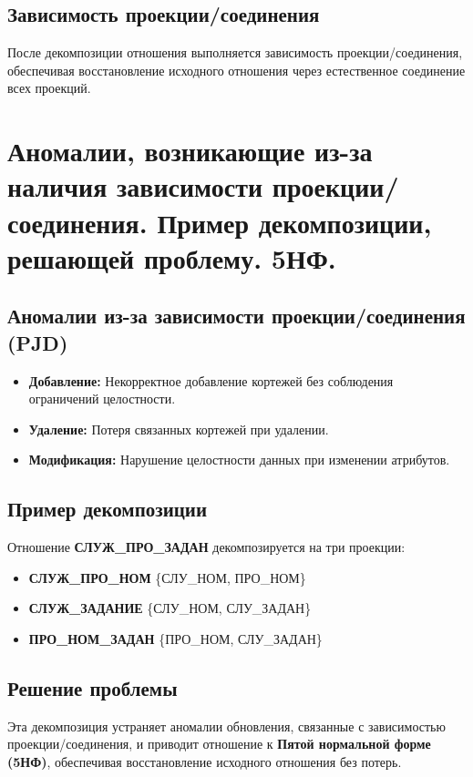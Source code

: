 \documentclass[a4paper,12pt]{article}
\begin{document}
\subsection{Зависимость проекции/соединения}

После декомпозиции отношения выполняется зависимость проекции/соединения, обеспечивая восстановление исходного отношения через естественное соединение всех проекций.

\section{Аномалии, возникающие из-за наличия зависимости проекции/соединения. Пример декомпозиции, решающей проблему. 5НФ.}

\subsection{Аномалии из-за зависимости проекции/соединения (PJD)}

\begin{itemize}
    \item \textbf{Добавление:} Некорректное добавление кортежей без соблюдения ограничений целостности.
    \item \textbf{Удаление:} Потеря связанных кортежей при удалении.
    \item \textbf{Модификация:} Нарушение целостности данных при изменении атрибутов.
\end{itemize}

\subsection{Пример декомпозиции}

Отношение \textbf{СЛУЖ\_ПРО\_ЗАДАН} декомпозируется на три проекции:
\begin{itemize}
    \item \textbf{СЛУЖ\_ПРО\_НОМ} \{СЛУ\_НОМ, ПРО\_НОМ\}
    \item \textbf{СЛУЖ\_ЗАДАНИЕ} \{СЛУ\_НОМ, СЛУ\_ЗАДАН\}
    \item \textbf{ПРО\_НОМ\_ЗАДАН} \{ПРО\_НОМ, СЛУ\_ЗАДАН\}
\end{itemize}

\subsection{Решение проблемы}

Эта декомпозиция устраняет аномалии обновления, связанные с зависимостью проекции/соединения, и приводит отношение к \textbf{Пятой нормальной форме (5НФ)}, обеспечивая восстановление исходного отношения без потерь.
\end{document}
